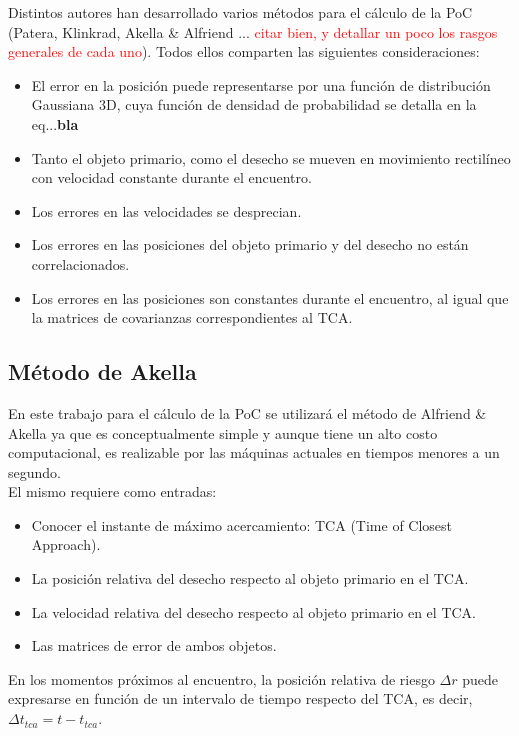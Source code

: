 Distintos autores han desarrollado varios m\'etodos para el c\'alculo de la PoC (Patera, Klinkrad, Akella \& Alfriend ... \textcolor{red}{citar bien,  y detallar un poco los rasgos generales de cada uno}). Todos ellos comparten las siguientes consideraciones:\\
\begin{itemize}
\itemsep0em
\item El error en la posici\'on puede representarse por una funci\'on de distribuci\'on Gaussiana 3D, cuya funci\'on de densidad de probabilidad se detalla en la eq...{\bf{bla}}
\item Tanto el objeto primario, como el desecho se mueven en movimiento rectil\'ineo con velocidad constante durante el encuentro.
\item Los errores en las velocidades se desprecian.
\item Los errores en las posiciones del objeto primario y del desecho no est\'an correlacionados.
\item Los errores en las posiciones son constantes durante el encuentro, al igual que la matrices de covarianzas correspondientes al TCA.
\end{itemize}

\subsection*{M\'etodo de Akella}
En este trabajo para el c\'alculo de la PoC se utilizar\'a el m\'etodo de Alfriend \& Akella \citep{akellaAlfriend} ya que es conceptualmente simple y aunque tiene un alto costo computacional, es realizable por las m\'aquinas actuales en tiempos menores a un segundo.\\

El mismo requiere como entradas:
\begin{itemize}
\itemsep0em
\item Conocer el instante de m\'aximo acercamiento: TCA (Time of Closest Approach).
\item La posici\'on relativa del desecho respecto al objeto primario en el TCA.
\item La velocidad relativa del desecho respecto al objeto primario en el TCA.
\item Las matrices de error de ambos objetos.
\end{itemize}

En los momentos pr\'oximos al encuentro, la posici\'on relativa de riesgo $\Delta r$ puede expresarse en funci\'on de un intervalo de tiempo respecto del TCA, es decir, $\Delta t_{tca}=t-t_{tca}$.

